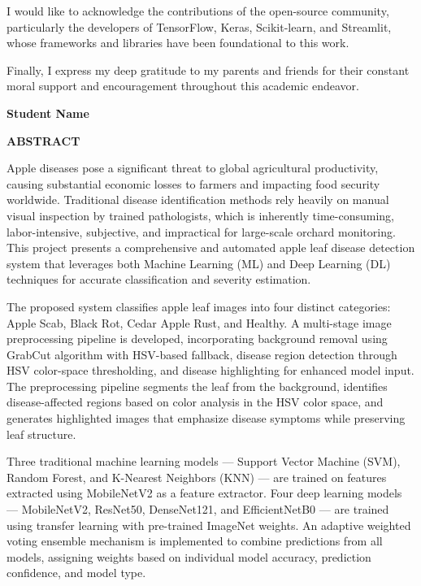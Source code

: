 \documentclass[12pt]{report}
\begin{document}
I would like to acknowledge the contributions of the open-source community, particularly the developers of TensorFlow, Keras, Scikit-learn, and Streamlit, whose frameworks and libraries have been foundational to this work.

Finally, I express my deep gratitude to my parents and friends for their constant moral support and encouragement throughout this academic endeavor.

\vfill
\begin{flushright}
\textbf{Student Name}
\end{flushright}

\newpage
\thispagestyle{fancy}
\begin{center}
\textbf{\large ABSTRACT}
\end{center}
\vspace{1cm}

Apple diseases pose a significant threat to global agricultural productivity, causing substantial economic losses to farmers and impacting food security worldwide. Traditional disease identification methods rely heavily on manual visual inspection by trained pathologists, which is inherently time-consuming, labor-intensive, subjective, and impractical for large-scale orchard monitoring. This project presents a comprehensive and automated apple leaf disease detection system that leverages both Machine Learning (ML) and Deep Learning (DL) techniques for accurate classification and severity estimation.

The proposed system classifies apple leaf images into four distinct categories: Apple Scab, Black Rot, Cedar Apple Rust, and Healthy. A multi-stage image preprocessing pipeline is developed, incorporating background removal using GrabCut algorithm with HSV-based fallback, disease region detection through HSV color-space thresholding, and disease highlighting for enhanced model input. The preprocessing pipeline segments the leaf from the background, identifies disease-affected regions based on color analysis in the HSV color space, and generates highlighted images that emphasize disease symptoms while preserving leaf structure.

Three traditional machine learning models --- Support Vector Machine (SVM), Random Forest, and K-Nearest Neighbors (KNN) --- are trained on features extracted using MobileNetV2 as a feature extractor. Four deep learning models --- MobileNetV2, ResNet50, DenseNet121, and EfficientNetB0 --- are trained using transfer learning with pre-trained ImageNet weights. An adaptive weighted voting ensemble mechanism is implemented to combine predictions from all models, assigning weights based on individual model accuracy, prediction confidence, and model type.
\end{document}
